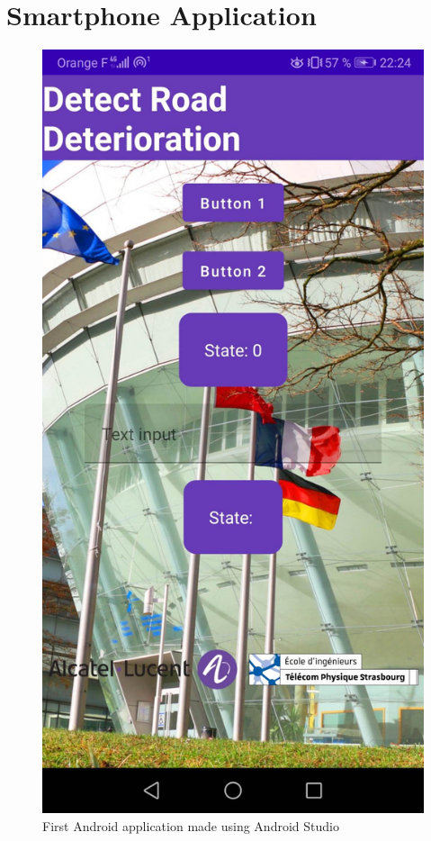 \section{Smartphone Application}

\begin{figure}
    \center
    \includegraphics[scale=.12]{img/test_app.jpg}
    \caption{First Android application made using Android Studio}
    \label{app}
\end{figure}

